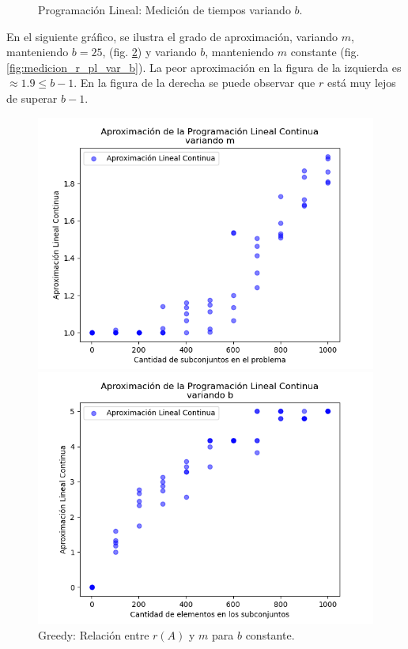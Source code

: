 \begin{figure}[h]
\begin{minipage}{0.45\textwidth}
        \caption{Programación Lineal: Medición de tiempos variando $b$.}
        \label{fig:medicion_t_pl_var_b}
    \end{minipage}
\end{figure}

En el siguiente gráfico, se ilustra el grado de aproximación, variando $m$, manteniendo $b=25$, (fig. \ref{fig:medicion_r_pl_var_m}) y variando $b$, manteniendo $m$ constante (fig. \ref{fig:medicion_r_pl_var_b}). La peor aproximación en la figura de la izquierda es $\approx 1.9\leq b-1$. En la figura de la derecha se puede observar que $r$ está muy lejos de superar $b-1$.

\begin{figure}[h]
    \centering
    \begin{minipage}{0.45\textwidth}
        \centering
        \includegraphics[width=\textwidth]{img/medicion_r_pl_var_m.png}
        \caption{Greedy: Relación entre $r(A)$ y $m$ para $b$ constante.}
        \label{fig:medicion_r_pl_var_m}
    \end{minipage}\hfill
    \begin{minipage}{0.45\textwidth}
        \centering
        \includegraphics[width=\textwidth]{img/medicion_r_pl_var_b.png}

\end{minipage}
\end{figure}
